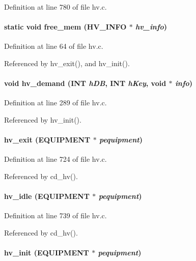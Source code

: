 Definition at line 780 of file hv.c.
\paragraph[{free\_\-mem}]{\setlength{\rightskip}{0pt plus 5cm}static void free\_\-mem ({\bf HV\_\-INFO} $\ast$ {\em hv\_\-info})}\hfill\label{hv_8c_a85cbcc39927a7a621dfe3b417ac6c0cb}


Definition at line 64 of file hv.c.

Referenced by hv\_\-exit(), and hv\_\-init().
\paragraph[{hv\_\-demand}]{\setlength{\rightskip}{0pt plus 5cm}void hv\_\-demand ({\bf INT} {\em hDB}, \/  {\bf INT} {\em hKey}, \/  void $\ast$ {\em info})}\hfill\label{hv_8c_a1972c5d2a46d25f2fa81e42d6fcbac1c}


Definition at line 289 of file hv.c.

Referenced by hv\_\-init().
\paragraph[{hv\_\-exit}]{ hv\_\-exit ({\bf EQUIPMENT} $\ast$ {\em pequipment})}\hfill\label{hv_8c_ac206528c83f8db2bd36c4d8c52ee0596}


Definition at line 724 of file hv.c.

Referenced by cd\_\-hv().
\paragraph[{hv\_\-idle}]{ hv\_\-idle ({\bf EQUIPMENT} $\ast$ {\em pequipment})}\hfill\label{hv_8c_aaa369e2228fc887094ab22aa51c1b68f}


Definition at line 739 of file hv.c.

Referenced by cd\_\-hv().
\paragraph[{hv\_\-init}]{ hv\_\-init ({\bf EQUIPMENT} $\ast$ {\em pequipment})}\hfill\label{hv_8c_ad9b5d26722c8f5bd4dd77951bfdb7f36}


